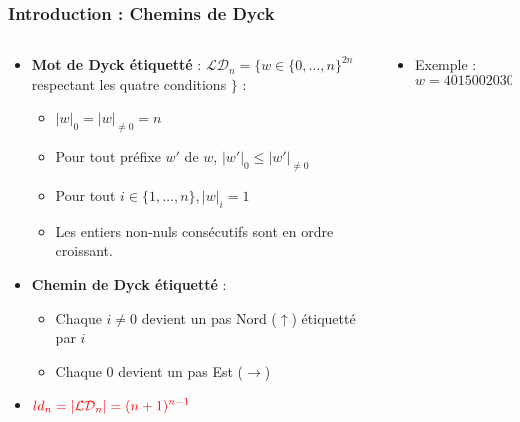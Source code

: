 \documentclass{beamer}
\begin{document}
\begin{frame}
    \frametitle{Introduction : Chemins de Dyck}
    \begin{columns}
        \begin{column}{0.65\textwidth}
            \begin{itemize}
                \item \textbf{Mot de Dyck étiquetté} : $\mathcal{LD}_n = 
                    \{w \in \{0,\ldots, n\}^{2n}$ respectant les 
                    quatre conditions $\}$ :
                \begin{itemize}
                    \item $|w|_0 = |w|_{\neq 0} = n$
                    \item Pour tout préfixe $w'$ de $w$, $|w'|_0 \leqslant
                        |w'|_{\neq 0}$
                    \item Pour tout $i \in \{1, \ldots, n\}, |w|_i = 1$
                    \item Les entiers non-nuls consécutifs sont en ordre
                        croissant.
                \end{itemize}
                \item \textbf{Chemin de Dyck étiquetté} :
                \begin{itemize}
                    \item Chaque $i \neq 0$ devient un pas Nord ($\uparrow$)
                        étiquetté par $i$
                    \item Chaque 0 devient un pas Est ($\rightarrow$)
                \end{itemize}
                \item $\color{red}{\displaystyle ld_n = |\mathcal{LD}_n| =
                    (n+1)^{n-1}}$
            \end{itemize}
        \end{column}
        \begin{column}{0.35\textwidth} 
                \begin{itemize}
                    \item Exemple : $w = 4015002030$
                \end{itemize}
                
        \end{column}
    \end{columns}
\end{frame}
\end{document}
